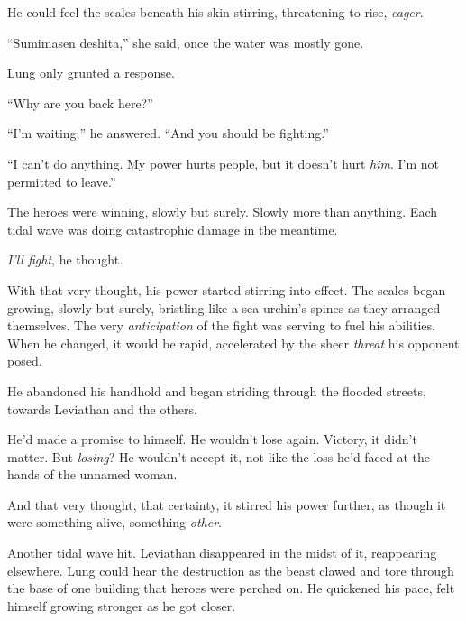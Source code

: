 He could feel the scales beneath his skin stirring, threatening to rise, \emph{eager}.



``Sumimasen deshita,'' she said, once the water was mostly gone.



Lung only grunted a response.



``Why are you back here?''



``I'm waiting,'' he answered.  ``And you should be fighting.''



``I can't do anything.  My power hurts people, but it doesn't hurt \emph{him}.  I'm not permitted to leave.''



The heroes were winning, slowly but surely.  Slowly more than anything.  Each tidal wave was doing catastrophic damage in the meantime.



\emph{I'll fight}, he thought.



With that very thought, his power started stirring into effect.  The scales began growing, slowly but surely, bristling like a sea urchin's spines as they arranged themselves.  The very \emph{anticipation} of the fight was serving to fuel his abilities.  When he changed, it would be rapid, accelerated by the sheer \emph{threat} his opponent posed.



He abandoned his handhold and began striding through the flooded streets, towards Leviathan and the others.



He'd made a promise to himself.  He wouldn't lose again.  Victory, it didn't matter.  But \emph{losing}?  He wouldn't accept it, not like the loss he'd faced at the hands of the unnamed woman.



And that very thought, that certainty, it stirred his power further, as though it were something alive, something \emph{other}.



Another tidal wave hit.  Leviathan disappeared in the midst of it, reappearing elsewhere.  Lung could hear the destruction as the beast clawed and tore through the base of one building that heroes were perched on.  He quickened his pace, felt himself growing stronger as he got closer.



